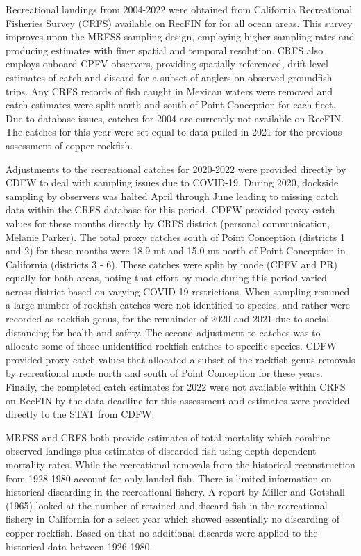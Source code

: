 \documentclass[11pt,
  english,
  letterpaper,
]{article}
\begin{document}
Recreational landings from 2004-2022 were obtained from California Recreational Fisheries Survey (CRFS) available on RecFIN for for all ocean areas. This survey improves upon the MRFSS sampling design, employing higher sampling rates and producing estimates with finer spatial and temporal resolution. CRFS also employs onboard CPFV observers, providing spatially referenced, drift-level estimates of catch and discard for a subset of anglers on observed groundfish trips. Any CRFS records of fish caught in Mexican waters were removed and catch estimates were split north and south of Point Conception for each fleet. Due to database issues, catches for 2004 are currently not available on RecFIN. The catches for this year were set equal to data pulled in 2021 for the previous assessment of copper rockfish.

Adjustments to the recreational catches for 2020-2022 were provided directly by CDFW to deal with sampling issues due to COVID-19. During 2020, dockside sampling by observers was halted April through June leading to missing catch data within the CRFS database for this period. CDFW provided proxy catch values for these months directly by CRFS district (personal communication, Melanie Parker). The total proxy catches south of Point Conception (districts 1 and 2) for these months were 18.9 mt and 15.0 mt north of Point Conception in California (districts 3 - 6). These catches were split by mode (CPFV and PR) equally for both areas, noting that effort by mode during this period varied across district based on varying COVID-19 restrictions. When sampling resumed a large number of rockfish catches were not identified to species, and rather were recorded as rockfish genus, for the remainder of 2020 and 2021 due to social distancing for health and safety. The second adjustment to catches was to allocate some of those unidentified rockfish catches to specific species. CDFW provided proxy catch values that allocated a subset of the rockfish genus removals by recreational mode north and south of Point Conception for these years. Finally, the completed catch estimates for 2022 were not available within CRFS on RecFIN by the data deadline for this assessment and estimates were provided directly to the STAT from CDFW.

MRFSS and CRFS both provide estimates of total mortality which combine observed landings plus estimates of discarded fish using depth-dependent mortality rates. While the recreational removals from the historical reconstruction from 1928-1980 account for only landed fish. There is limited information on historical discarding in the recreational fishery. A report by Miller and Gotshall (1965) looked at the number of retained and discard fish in the recreational fishery in California for a select year which showed essentially no discarding of copper rockfish. Based on that no additional discards were applied to the historical data between 1926-1980.
\end{document}
